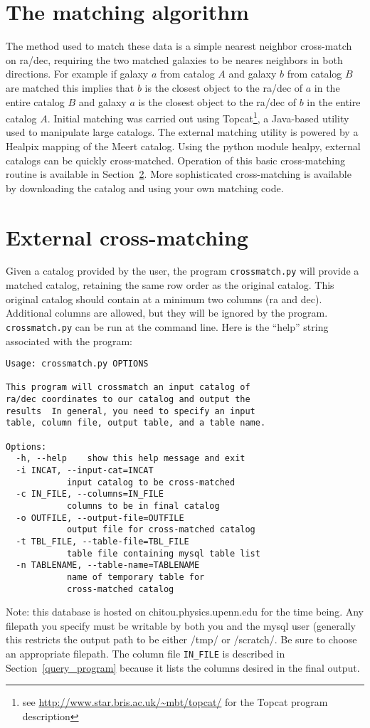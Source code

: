 \documentclass[useAMS,usenatbib,usegraphicx]{./mn2e}
\begin{document}
\section{The matching algorithm}\label{matching}
The method used to match these data is a simple nearest neighbor cross-match on ra/dec, requiring the two matched galaxies to be neares neighbors in both directions. For example if galaxy $a$ from catalog $A$ and galaxy $b$ from catalog $B$ are matched this implies that $b$ is the closest object to the ra/dec of 
 $a$ in the entire catalog $B$ and galaxy $a$ is the closest object to the ra/dec of $b$ in the entire catalog $A$. Initial matching was carried out using Topcat\footnote{see \url{http://www.star.bris.ac.uk/~mbt/topcat/} for the Topcat program description}, a Java-based utility used to manipulate large catalogs. The external matching utility is powered by a Healpix mapping of the Meert catalog. Using the python module healpy, external catalogs can be quickly cross-matched. Operation of this basic cross-matching routine is available in Section~\ref{crossmatch_program}. More sophisticated cross-matching is available by downloading the catalog and using your own matching code. 

\section{External cross-matching}\label{crossmatch_program}
Given a catalog provided by the user, the program \texttt{crossmatch.py} will provide a matched catalog, retaining the same row order as the original catalog. This original catalog should contain at a minimum two columns (ra and dec). Additional columns are allowed, but they will be ignored by the program. \texttt{crossmatch.py} can be run at the command line. Here is the ``help'' string associated with the program:\\
\begin{verbatim}
Usage: crossmatch.py OPTIONS

This program will crossmatch an input catalog of 
ra/dec coordinates to our catalog and output the
results  In general, you need to specify an input
table, column file, output table, and a table name.

Options:
  -h, --help    show this help message and exit
  -i INCAT, --input-cat=INCAT
            input catalog to be cross-matched
  -c IN_FILE, --columns=IN_FILE
            columns to be in final catalog
  -o OUTFILE, --output-file=OUTFILE
            output file for cross-matched catalog
  -t TBL_FILE, --table-file=TBL_FILE
            table file containing mysql table list
  -n TABLENAME, --table-name=TABLENAME
            name of temporary table for 
            cross-matched catalog
\end{verbatim} 
Note: this database is hosted on chitou.physics.upenn.edu for the time being. Any filepath you specify must be writable by both you and the mysql user (generally this restricts the output path to be either /tmp/ or /scratch/. Be sure to choose an appropriate filepath. The column file \texttt{IN\_FILE} is described in Section~\ref{query_program} because it lists the columns desired in the final output.
\end{document}
